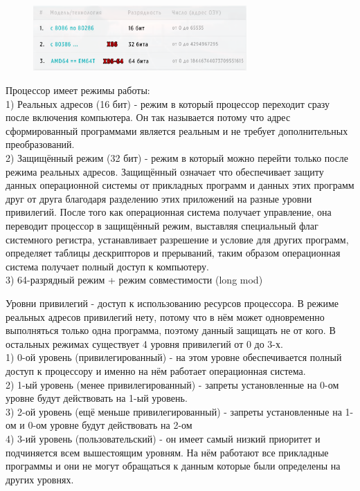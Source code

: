 	\begin{figure}[h]
		\centering
		\includegraphics[height=2.5cm]{img/2.4} 
		\captionsetup{font=footnotesize} 
		\caption*{} 
	\end{figure}
	
	\par Процессор имеет режимы работы:
	\\
	1) Реальных адресов (16 бит) - режим в который процессор переходит сразу после включения компьютера. Он так называется потому что адрес сформированный программами является реальным и не требует дополнительных преобразований.
	\\
	2) Защищённый режим (32 бит) - режим в который можно перейти только после режима реальных адресов. Защищённый означает что обеспечивает защиту данных операционной системы от прикладных программ и данных этих программ друг от друга благодаря разделению этих приложений на разные уровни привилегий. После того как операционная система получает управление, она переводит процессор в защищённый режим, выставляя специальный флаг системного регистра, устанавливает разрешение и условие для других программ, определяет таблицы дескрипторов и прерываний, таким образом операционная система получает полный доступ к компьютеру. 
	\\
	3) 64-разрядный режим + режим совместимости (long mod)
	
	\par Уровни привилегий - доступ к использованию ресурсов процессора. В режиме реальных адресов привилегий нету, потому что в нём может одновременно выполняться только одна программа, поэтому данный защищать не от кого. В остальных режимах существует 4 уровня привилегий от 0 до 3-х.
	\\
	1) 0-ой уровень (привилегированный) - на этом уровне обеспечивается полный доступ к процессору и именно на нём работает операционная система.
	\\
	2) 1-ый уровень (менее привилегированный) - запреты установленные на 0-ом уровне будут действовать на 1-ый уровень.
    \\
	3) 2-ой уровень (ещё меньше привилегированный) - запреты установленные на 1-ом и 0-ом уровне будут действовать на 2-ом
	\\
	4) 3-ий уровень (пользовательский) - он имеет самый низкий приоритет и подчиняется всем вышестоящим уровням. На нём работают все прикладные программы и они не могут обращаться к данным которые были определены на других уровнях. 
	
